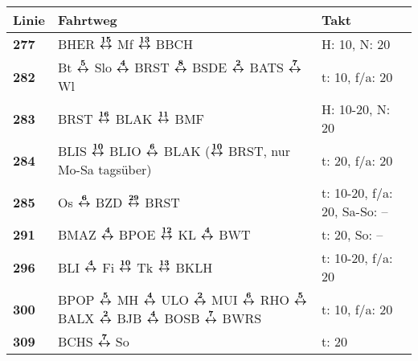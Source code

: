 \begin{minipage}[t]{0.05\textwidth}
\phantom{Tor}
\end{minipage}
\begin{minipage}[t]{0.45\textwidth}
\begin{tabular}{>{\bfseries}L{1.2cm}L{9.0cm}L{3.0cm}}
{\bfseries Linie} & {\bfseries Fahrtweg} & {\bfseries Takt} \\
\hline
\bus{} 277    & BHER $\boldsymbol{\overset{15}{\leftrightarrow}}$ Mf $\boldsymbol{\overset{13}{\leftrightarrow}}$ BBCH                                                                                                                              & H: 10, N: 20               \\
\bus{} 282    & Bt $\boldsymbol{\overset{5}{\leftrightarrow}}$ Slo $\boldsymbol{\overset{4}{\leftrightarrow}}$ BRST $\boldsymbol{\overset{8}{\leftrightarrow}}$ BSDE $\boldsymbol{\overset{2}{\leftrightarrow}}$ BATS $\boldsymbol{\overset{7}{\leftrightarrow}}$ Wl                                                                                & t: 10, f/a: 20             \\
\bus{} 283    & BRST $\boldsymbol{\overset{16}{\leftrightarrow}}$ BLAK $\boldsymbol{\overset{11}{\leftrightarrow}}$ BMF                                                                                                                             & H: 10-20, N: 20            \\
\bus{} 284    & BLIS $\boldsymbol{\overset{10}{\leftrightarrow}}$ BLIO $\boldsymbol{\overset{6}{\leftrightarrow}}$ BLAK ($\boldsymbol{\overset{10}{\leftrightarrow}}$ BRST, nur Mo-Sa tagsüber)                                                                                     & t: 20, f/a: 20             \\
\bus{} 285    & Os $\boldsymbol{\overset{6}{\leftrightarrow}}$ BZD $\boldsymbol{\overset{29}{\leftrightarrow}}$ BRST                                                                                                                                & t: 10-20, f/a: 20, Sa-So: -- \\
\bus{} 291    & BMAZ $\boldsymbol{\overset{4}{\leftrightarrow}}$ BPOE $\boldsymbol{\overset{12}{\leftrightarrow}}$ KL $\boldsymbol{\overset{4}{\leftrightarrow}}$ BWT                                                                                                               & t: 20, So: --              \\
\bus{} 296    & BLI $\boldsymbol{\overset{4}{\leftrightarrow}}$ Fi $\boldsymbol{\overset{10}{\leftrightarrow}}$ Tk $\boldsymbol{\overset{13}{\leftrightarrow}}$ BKLH                                                                                                                & t: 10-20, f/a: 20          \\
\bus{} 300    & BPOP $\boldsymbol{\overset{5}{\leftrightarrow}}$ MH $\boldsymbol{\overset{4}{\leftrightarrow}}$ ULO $\boldsymbol{\overset{2}{\leftrightarrow}}$ MUI $\boldsymbol{\overset{6}{\leftrightarrow}}$ RHO $\boldsymbol{\overset{5}{\leftrightarrow}}$ BALX $\boldsymbol{\overset{2}{\leftrightarrow}}$ BJB $\boldsymbol{\overset{4}{\leftrightarrow}}$ BOSB $\boldsymbol{\overset{7}{\leftrightarrow}}$ BWRS                              & t: 10, f/a: 20             \\
\bus{} 309    & BCHS $\boldsymbol{\overset{7}{\leftrightarrow}}$ So                                                                                                                                                 & t: 20                      \\

\end{tabular}
\end{minipage}
